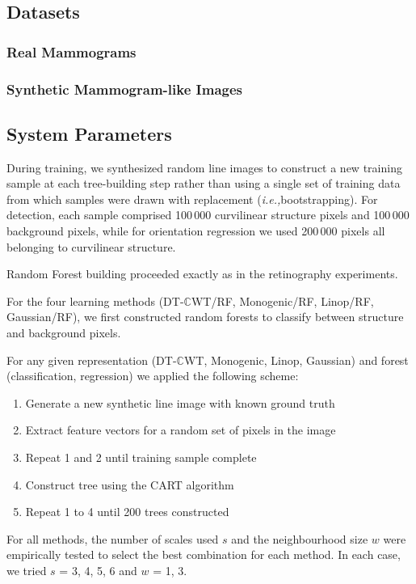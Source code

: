 \documentclass{IEEEtran}
\def\ie{\emph{i.e.,}}
\def\dtcwt{DT-$\mathbb{C}$WT}
\begin{document}
\subsection{Datasets}
\subsubsection{Real Mammograms}


\subsubsection{Synthetic Mammogram-like Images}


\subsection{System Parameters}
During training, we synthesized random line images to construct a new training sample at each tree-building step rather than using a single set of training data from which samples were drawn with replacement (\ie bootstrapping). For detection, each sample comprised 100\,000 curvilinear structure pixels and 100\,000 background pixels, while for orientation regression we used 200\,000 pixels all belonging to curvilinear structure. 

Random Forest building proceeded exactly as in the retinography experiments.

For the four learning methods (\dtcwt{}/RF, Monogenic/RF, Linop/RF, Gaussian/RF), we first constructed random forests to classify between structure and background pixels.

For any given representation (\dtcwt{}, Monogenic, Linop, Gaussian) and forest (classification, regression) we applied the following scheme:

\begin{enumerate}
\item	Generate a new synthetic line image with known ground truth
\item Extract feature vectors for a random set of pixels in the image
\item Repeat 1 and 2 until training sample complete
\item Construct tree using the CART algorithm
\item Repeat 1 to 4 until 200 trees constructed
\end{enumerate}

For all methods, the number of scales used $s$ and the neighbourhood size $w$ were empirically tested to select the best combination for each method. In each case, we tried $s$ = 3, 4, 5, 6 and $w$ = 1, 3.
\end{document}
